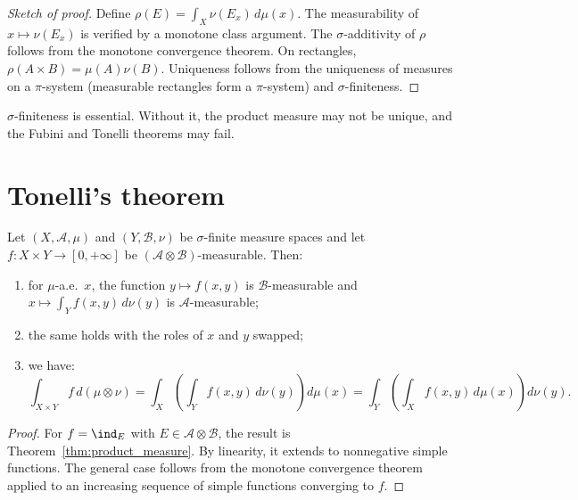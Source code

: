 \begin{proof}[Sketch of proof]
Define $\rho(E) = \int_X \nu(E_x)\, d\mu(x)$. The measurability of
$x \mapsto \nu(E_x)$ is verified by a monotone class argument. The
$\sigma$-additivity of $\rho$ follows from the monotone convergence theorem.
On rectangles, $\rho(A \times B) = \mu(A)\nu(B)$. Uniqueness follows from the
uniqueness of measures on a $\pi$-system (measurable rectangles form a
$\pi$-system) and $\sigma$-finiteness.
\end{proof}

\begin{attention}[title=\textbf{$\sigma$-finiteness hypothesis}]
$\sigma$-finiteness is essential. Without it, the product measure may not be unique,
and the Fubini and Tonelli theorems may fail.
\end{attention}

\section{Tonelli's theorem}

\begin{theorem}[Tonelli]
\label{thm:tonelli}
Let $(X, \mathcal{A}, \mu)$ and $(Y, \mathcal{B}, \nu)$ be $\sigma$-finite measure
spaces and let $f : X \times Y \to [0, +\infty]$ be
$(\mathcal{A} \otimes \mathcal{B})$-measurable. Then:
\begin{enumerate}
    \item[(i)] for $\mu$-a.e.\ $x$, the function $y \mapsto f(x,y)$ is
    $\mathcal{B}$-measurable and $x \mapsto \int_Y f(x,y)\, d\nu(y)$ is
    $\mathcal{A}$-measurable;
    \item[(ii)] the same holds with the roles of $x$ and $y$ swapped;
    \item[(iii)] we have:
    \[
        \int_{X \times Y} f\, d(\mu \otimes \nu)
        = \int_X \!\left(\int_Y f(x,y)\, d\nu(y)\right) d\mu(x)
        = \int_Y \!\left(\int_X f(x,y)\, d\mu(x)\right) d\nu(y).
    \]
\end{enumerate}
\end{theorem}

\begin{proof}
For $f = \ind_E$ with $E \in \mathcal{A} \otimes \mathcal{B}$, the result is
Theorem~\ref{thm:product_measure}. By linearity, it extends to nonnegative simple
functions. The general case follows from the monotone convergence theorem applied to
an increasing sequence of simple functions converging to $f$.
\end{proof}

